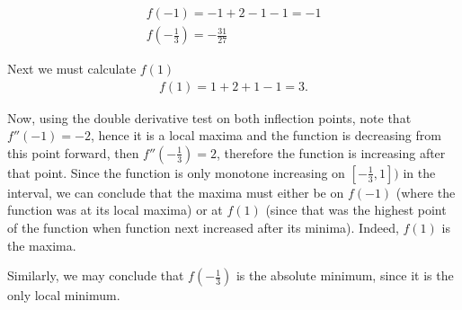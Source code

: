 \documentclass[a4paper]{article}
\begin{document}
\begin{align*}
	f(-1) = -1 + 2 - 1 -1 = -1 \\
	f\left(-\frac{1}{3}\right) = -\frac{31}{27}
\end{align*}

Next we must calculate \(f(1)\)
\begin{align*}
	f(1) = 1 + 2 + 1 - 1 = 3.
\end{align*}

Now, using the double derivative test on both inflection points, note that \(f''(-1) = -2\), hence it is a local maxima and the function is decreasing from this point forward, then \(f''\left(-\frac{1}{3}\right) = 2\), therefore the function is increasing after that point. Since the function is only monotone increasing on \(\left[-\frac{1}{3}, 1\right])\) in the interval, we can conclude that the maxima must either be on \(f(-1)\) (where the function was at its local maxima) or at \(f(1)\) (since that was the highest point of the function when function next increased after its minima). Indeed, \(f(1)\) is the maxima.

Similarly, we may conclude that \(f\left(-\frac{1}{3}\right)\) is the absolute minimum, since it is the only local minimum.
\end{document}
